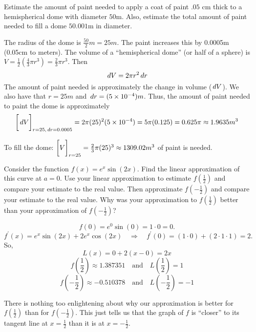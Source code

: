 \documentclass[handout,nooutcomes]{ximera}
\begin{document}
\begin{problem}
Estimate the amount of paint needed to apply a coat of paint $.05$ cm thick to a hemispherical dome with diameter $50$m.  Also, estimate the total amount of paint needed to fill a dome $50.001$m in diameter.
		\begin{freeResponse}
		The radius of the dome is $\frac{50}{2}m=25m$.  The paint increases this by 0.0005m (0.05cm to meters).  The volume of a ``hemispherical dome'' (or half of a sphere) is $V = \frac{1}{2} \left(\frac{4}{3} \pi r^3 \right) = \frac{2}{3} \pi r^3$.  Then
		$$ \,d V = 2 \pi r^2 \,d r  $$
		The amount of paint needed is approximately the change in volume ($\,d V$).  We also have that $r=25m$ and $\,d r = (5 \times 10^{-4}) m$.  Thus, the amount of paint needed to paint the dome is approximately
		$$ \bigg[ \,d V \bigg]_{r=25,\,d r = 0.0005} = 2 \pi (25)^2 (5 \times 10^{-4}) = 5 \pi (0.125) = 0.625 \pi \approx 1.9635 m^3$$
		
		To fill the dome: $\bigg[ V \bigg]_{r=25}=\frac{2}{3}\pi (25)^3 \approx 1309.02 m^3$ of paint is needed.
		\end{freeResponse}
			
			
		
\end{problem}












\begin{problem}
Consider the function $f(x) = e^x \sin (2x)$.  Find the linear approximation of this curve at $a=0$.  Use your linear approximation to estimate $f\left( \frac{1}{2} \right)$ and compare your estimate to the real value.  Then approximate $f\left( - \frac{1}{2} \right)$ and compare your estimate to the real value.  Why was your approximation to $f\left( \frac{1}{2} \right)$ better than your approximation of $f\left( - \frac{1}{2} \right)$?  
		\begin{freeResponse}
		$$f(0) = e^0 \sin(0) = 1 \cdot 0 = 0.$$  
		$$f^\prime (x) = e^x \sin(2x) + 2e^x \cos(2x) \quad \Longrightarrow \quad f^\prime (0) = (1 \cdot 0) + (2 \cdot 1 \cdot 1) = 2.$$
		So,
		$$ L(x) = 0 + 2(x-0) = 2x $$
		$$ f \left( \frac{1}{2} \right) \approx 1.387351 \quad \text{and} \quad L\left( \frac{1}{2} \right) = 1 $$
		$$ f \left( - \frac{1}{2} \right) \approx -0.510378 \quad \text{and} \quad L\left( - \frac{1}{2} \right) = - 1 $$
		
		There is nothing too enlightening about why our approximation is better for $f\left( \frac{1}{2} \right)$ than for $f\left( - \frac{1}{2} \right)$.  This just tells us that the graph of $f$ is ``closer'' to its tangent line at $x=\frac{1}{2}$ than it is at $x=-\frac{1}{2}$.  
		\end{freeResponse}
			
			
	
\end{problem}
\end{document}
